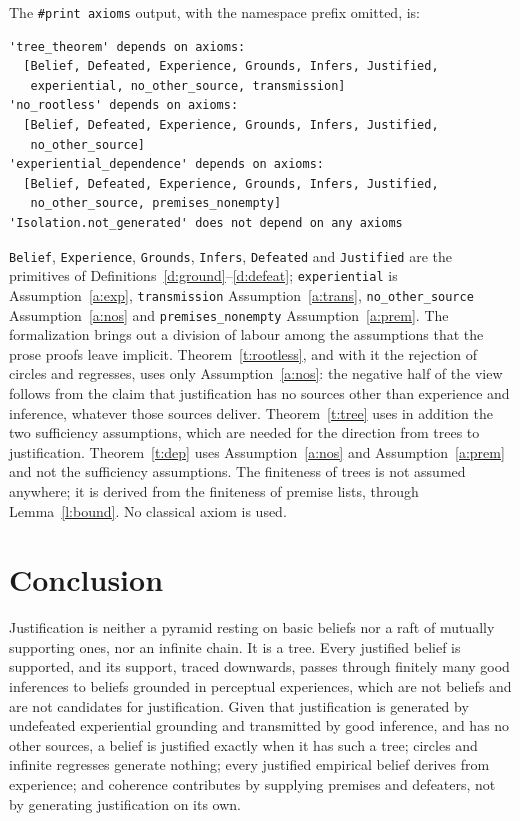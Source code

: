 \documentclass{situationist-preprint}
\begin{document}
The \texttt{\#print axioms} output, with the namespace prefix omitted, is:

\begin{lstlisting}
'tree_theorem' depends on axioms:
  [Belief, Defeated, Experience, Grounds, Infers, Justified,
   experiential, no_other_source, transmission]
'no_rootless' depends on axioms:
  [Belief, Defeated, Experience, Grounds, Infers, Justified,
   no_other_source]
'experiential_dependence' depends on axioms:
  [Belief, Defeated, Experience, Grounds, Infers, Justified,
   no_other_source, premises_nonempty]
'Isolation.not_generated' does not depend on any axioms
\end{lstlisting}

\begin{sloppypar}
\texttt{Belief}, \texttt{Experience}, \texttt{Grounds}, \texttt{Infers}, \texttt{Defeated} and \texttt{Justified} are the primitives of Definitions~\ref{d:ground}--\ref{d:defeat}; \texttt{experiential} is Assumption~\ref{a:exp}, \texttt{transmission} Assumption~\ref{a:trans}, \texttt{no\_other\_source} Assumption~\ref{a:nos} and \texttt{premises\_nonempty} Assumption~\ref{a:prem}. The formalization brings out a division of labour among the assumptions that the prose proofs leave implicit. Theorem~\ref{t:rootless}, and with it the rejection of circles and regresses, uses only Assumption~\ref{a:nos}: the negative half of the view follows from the claim that justification has no sources other than experience and inference, whatever those sources deliver. Theorem~\ref{t:tree} uses in addition the two sufficiency assumptions, which are needed for the direction from trees to justification. Theorem~\ref{t:dep} uses Assumption~\ref{a:nos} and Assumption~\ref{a:prem} and not the sufficiency assumptions. The finiteness of trees is not assumed anywhere; it is derived from the finiteness of premise lists, through Lemma~\ref{l:bound}. No classical axiom is used.
\end{sloppypar}

\section{Conclusion}

Justification is neither a pyramid resting on basic beliefs nor a raft of mutually supporting ones, nor an infinite chain. It is a tree. Every justified belief is supported, and its support, traced downwards, passes through finitely many good inferences to beliefs grounded in perceptual experiences, which are not beliefs and are not candidates for justification. Given that justification is generated by undefeated experiential grounding and transmitted by good inference, and has no other sources, a belief is justified exactly when it has such a tree; circles and infinite regresses generate nothing; every justified empirical belief derives from experience; and coherence contributes by supplying premises and defeaters, not by generating justification on its own.
\end{document}
